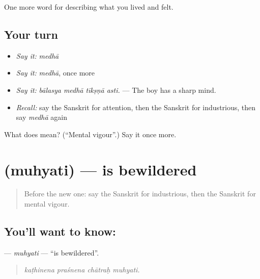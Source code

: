 \begin{grammarlens}[title={What you've built}]
One more word for describing what you lived and felt.
\end{grammarlens}

\subsection*{Your turn}
\begin{itemize}
\raggedright
  \item \emph{Say it:} \emph{medhā}
  \item \emph{Say it:} \emph{medhā}, once more
  \item \emph{Say it:} \emph{bālasya medhā tīkṣṇā asti.} — The boy has a sharp mind.
  \item \emph{Recall:} say the Sanskrit for attention, then the Sanskrit for industrious, then say \emph{medhā} again
\end{itemize}

\begin{tcolorbox}[breakable,colback=teal!4,colframe=teal!35!black,title={Before you move on}]
What does  mean? (\textquotedblleft{}Mental vigour\textquotedblright{}.) Say it once more.
\end{tcolorbox}
\section[\texorpdfstring{\sk{मुह्यति} (muhyati)}{मुह्यति (muhyati)}]{ (muhyati) — is bewildered}

\label{lesson:SA-C466-muhyati}



\begin{quote}
Before the new one: say the Sanskrit for industrious, then the Sanskrit for mental vigour.
\end{quote}

\subsection*{You'll want to know: }
\textbf{} — \emph{muhyati} — \textquotedblleft{}is bewildered\textquotedblright{}.

\begin{quote}
   
\end{quote}

\begin{quote}
\emph{kaṭhinena praśnena chātraḥ muhyati.}
\end{quote}

